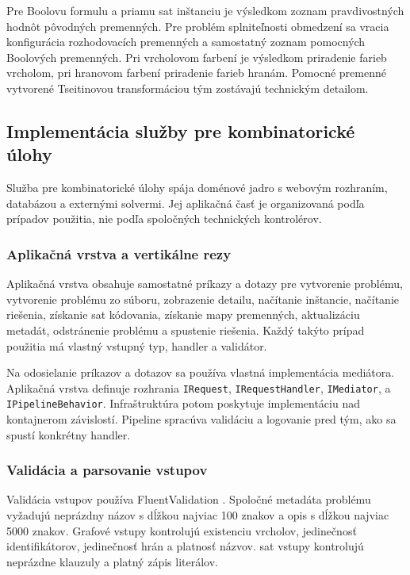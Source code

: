 Pre Boolovu formulu a priamu \acrshort{sat} inštanciu je výsledkom zoznam pravdivostných hodnôt pôvodných premenných. Pre problém splniteľnosti obmedzení sa vracia konfigurácia rozhodovacích premenných a samostatný zoznam pomocných Boolových premenných. Pri vrcholovom farbení je výsledkom priradenie farieb vrcholom, pri hranovom farbení priradenie farieb hranám. Pomocné premenné vytvorené Tseitinovou transformáciou tým zostávajú technickým detailom.

\subsection{Implementácia služby pre kombinatorické úlohy}\label{sec:implementation:combinatorics-service}
Služba pre kombinatorické úlohy spája doménové jadro s webovým rozhraním, databázou a externými solvermi. Jej aplikačná časť je organizovaná podľa prípadov použitia, nie podľa spoločných technických kontrolérov.

\subsubsection{Aplikačná vrstva a vertikálne rezy}\label{sec:implementation:application-layer}
Aplikačná vrstva obsahuje samostatné príkazy a dotazy pre vytvorenie problému, vytvorenie problému zo súboru, zobrazenie detailu, načítanie inštancie, načítanie riešenia, získanie \acrshort{sat} kódovania, získanie mapy premenných, aktualizáciu metadát, odstránenie problému a spustenie riešenia. Každý takýto prípad použitia má vlastný vstupný typ, handler a validátor.

Na odosielanie príkazov a dotazov sa používa vlastná implementácia mediátora. Aplikačná vrstva definuje rozhrania \texttt{IRequest}, \texttt{IRequestHandler}, \texttt{IMediator}, \newline a \texttt{IPipelineBehavior}. Infraštruktúra potom poskytuje implementáciu nad kontajnerom závislostí. Pipeline spracúva validáciu a logovanie pred tým, ako sa spustí konkrétny handler.

\subsubsection{Validácia a parsovanie vstupov}\label{sec:implementation:input-validation-parsing}
Validácia vstupov používa FluentValidation \cite{fluentvalidation-docs}. Spoločné metadáta problému vyžadujú neprázdny názov s dĺžkou najviac 100 znakov a opis s dĺžkou najviac 5000 znakov. Grafové vstupy kontrolujú existenciu vrcholov, jedinečnosť identifikátorov, jedinečnosť hrán a platnosť názvov. \acrshort{sat} vstupy kontrolujú neprázdne klauzuly a platný zápis literálov.

